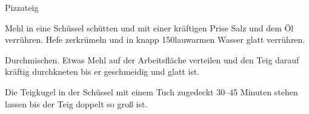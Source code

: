 \begin{recipe}[\vegan]{Pizzateig}

    \begin{ingredients}
    \end{ingredients}

    \begin{instructions}
        Mehl in eine Schüssel schütten und mit einer kräftigen Prise Salz und dem Öl verrühren.
        Hefe zerkrümeln und in knapp 150\milliliter lauwarmen Wasser glatt verrühren.

        Durchmischen. Etwas Mehl auf der Arbeitsfläche verteilen und den Teig darauf kräftig durchkneten bis er geschmeidig und glatt ist.

        Die Teigkugel in der Schüssel mit einem Tuch zugedeckt 30--45 Minuten stehen lassen bis der Teig doppelt so groß ist.
    \end{instructions}
\end{recipe}
